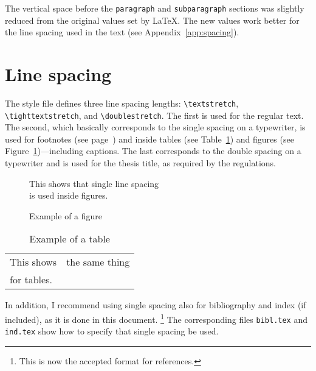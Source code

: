 The vertical space before the
\verb+paragraph+ and
\verb+subparagraph+ sections
was slightly reduced from the original values set by \LaTeX{}. The new
values work better for the line spacing used in the text (see
Appendix~\ref{app:spacing}).

\section{Line spacing}
\label{spacing}

The style file defines three line spacing lengths:
\verb+\textstretch+, \verb+\tighttextstretch+, and
\verb+\doublestretch+. The first is used for the regular text. The
second, which basically corresponds to the single spacing%
on a typewriter, is used for footnotes (see
page~\pageref{foot}) and inside tables (see
Table~\ref{tab1}) and figures (see
Figure~\ref{fig1})---including captions.
The last corresponds to the double spacing on a
typewriter and is used for the thesis title, as required by the
regulations.

\begin{figure}[htbp]
  \begin{center}
    This shows that single line spacing\\
    is used inside figures.
    \caption{Example of a figure\label{fig1}}
  \end{center}
\end{figure}
%
\vspace*{-.3in}
\begin{table}[htbp]
  \begin{center}
    \begin{tabular}[t]{|ll|}
      \hline
      This shows & the same thing\\
      for tables. & \\
      \hline
    \end{tabular}
    \caption{Example of a table\label{tab1}}
  \end{center}
\end{table}

In addition, I recommend using single spacing also for
bibliography and index%
 (if included), as it is done in this
document.%
\footnote{This is now the accepted format for references.} The corresponding files
\texttt{bibl.tex} and
\texttt{ind.tex} show how to specify
that single spacing be used.


